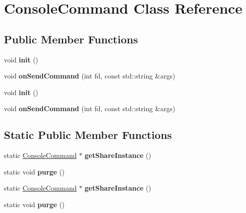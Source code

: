 \hypertarget{classConsoleCommand}{}\section{Console\+Command Class Reference}
\label{classConsoleCommand}
\subsection*{Public Member Functions}
\begin{DoxyCompactItemize}
\item 
\mbox{\label{classConsoleCommand_a9874eba82281bbb5d50bca5f1b473855}} 
void {\bfseries init} ()
\item 
\mbox{\label{classConsoleCommand_a0e734289f677bbab0e5db281a0d10c0e}} 
void {\bfseries on\+Send\+Command} (int fd, const std\+::string \&args)
\item 
\mbox{\label{classConsoleCommand_a9874eba82281bbb5d50bca5f1b473855}} 
void {\bfseries init} ()
\item 
\mbox{\label{classConsoleCommand_a0e734289f677bbab0e5db281a0d10c0e}} 
void {\bfseries on\+Send\+Command} (int fd, const std\+::string \&args)
\end{DoxyCompactItemize}
\subsection*{Static Public Member Functions}
\begin{DoxyCompactItemize}
\item 
\mbox{\label{classConsoleCommand_a4c93115e605e63e2f3a253cf02e007d4}} 
static \hyperlink{classConsoleCommand}{Console\+Command} $\ast$ {\bfseries get\+Share\+Instance} ()
\item 
\mbox{\label{classConsoleCommand_ac002a3a91e44b8e5e03ebcb05451334c}} 
static void {\bfseries purge} ()
\item 
\mbox{\label{classConsoleCommand_a081bfb10c7467799e3574655a0af02b9}} 
static \hyperlink{classConsoleCommand}{Console\+Command} $\ast$ {\bfseries get\+Share\+Instance} ()
\item 
\mbox{\label{classConsoleCommand_a7c4011332c8fa950ee2ce49fcdfba523}} 
static void {\bfseries purge} ()
\end{DoxyCompactItemize}


